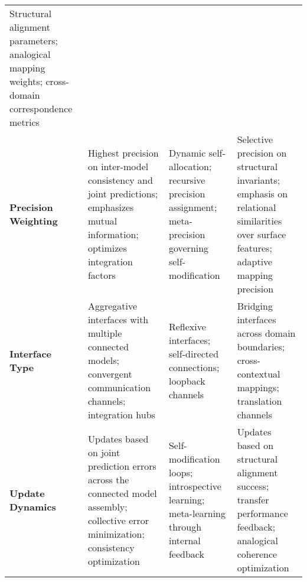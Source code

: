 \documentclass[
]{book}
\begin{document}
\begin{longtable}[]{@{}llll@{}}
\begin{minipage}[t]{0.27\columnwidth}
Structural alignment parameters; analogical mapping weights;
cross-domain correspondence metrics\strut
\end{minipage}\tabularnewline
\begin{minipage}[t]{0.11\columnwidth}\raggedright
\textbf{Precision Weighting}\strut
\end{minipage} & \begin{minipage}[t]{0.26\columnwidth}\raggedright
Highest precision on inter-model consistency and joint predictions;
emphasizes mutual information; optimizes integration factors\strut
\end{minipage} & \begin{minipage}[t]{0.24\columnwidth}\raggedright
Dynamic self-allocation; recursive precision assignment; meta-precision
governing self-modification\strut
\end{minipage} & \begin{minipage}[t]{0.27\columnwidth}\raggedright
Selective precision on structural invariants; emphasis on relational
similarities over surface features; adaptive mapping precision\strut
\end{minipage}\tabularnewline
\begin{minipage}[t]{0.11\columnwidth}\raggedright
\textbf{Interface Type}\strut
\end{minipage} & \begin{minipage}[t]{0.26\columnwidth}\raggedright
Aggregative interfaces with multiple connected models; convergent
communication channels; integration hubs\strut
\end{minipage} & \begin{minipage}[t]{0.24\columnwidth}\raggedright
Reflexive interfaces; self-directed connections; loopback channels\strut
\end{minipage} & \begin{minipage}[t]{0.27\columnwidth}\raggedright
Bridging interfaces across domain boundaries; cross-contextual mappings;
translation channels\strut
\end{minipage}\tabularnewline
\begin{minipage}[t]{0.11\columnwidth}\raggedright
\textbf{Update Dynamics}\strut
\end{minipage} & \begin{minipage}[t]{0.26\columnwidth}\raggedright
Updates based on joint prediction errors across the connected model
assembly; collective error minimization; consistency optimization\strut
\end{minipage} & \begin{minipage}[t]{0.24\columnwidth}\raggedright
Self-modification loops; introspective learning; meta-learning through
internal feedback\strut
\end{minipage} & \begin{minipage}[t]{0.27\columnwidth}\raggedright
Updates based on structural alignment success; transfer performance
feedback; analogical coherence optimization\strut
\end{minipage}\tabularnewline
\bottomrule
\end{longtable}

\backmatter
\end{document}
